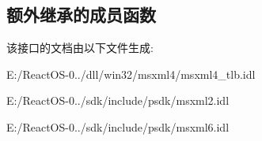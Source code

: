 \subsection*{额外继承的成员函数}


该接口的文档由以下文件生成\+:\begin{DoxyCompactItemize}
\item 
E\+:/\+React\+O\+S-\/0../dll/win32/msxml4/msxml4\+\_\+tlb.\+idl\item 
E\+:/\+React\+O\+S-\/0../sdk/include/psdk/msxml2.\+idl\item 
E\+:/\+React\+O\+S-\/0../sdk/include/psdk/msxml6.\+idl\end{DoxyCompactItemize}
